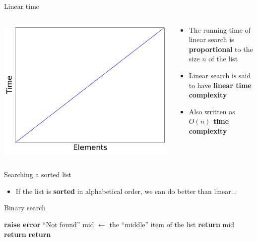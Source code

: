 \begin{frame}{Linear time}
	\begin{columns}
		\begin{column}{0.45\textwidth}
			\includegraphics[width=\textwidth]{plot2_linear}
		\end{column}
		\begin{column}{0.55\textwidth}
			\begin{itemize}
				\item The running time of linear search is \textbf{proportional} to the size $n$ of the list \pause
				\item Linear search is said to have \textbf{linear time complexity} \pause
				\item Also written as \textbf{$O(n)$ time complexity}
			\end{itemize}
		\end{column}
	\end{columns}
\end{frame}

\begin{frame}{Searching a sorted list}
			\begin{itemize}
				\item If the list is \textbf{sorted} in alphabetical order, we can do better than linear...
			\end{itemize}
\end{frame}

\begin{frame}{Binary search}
	\begin{algorithmic}
		 \pause
				\State \textbf{raise error} ``Not found''
			\EndIf \pause
			\State mid $\gets$ the ``middle'' item of the list \pause
				\State \textbf{return} mid \pause
				\State \textbf{return}  \pause
				\State \textbf{return}  \pause
			\EndIf
		\EndProcedure
	\end{algorithmic}
\end{frame}

